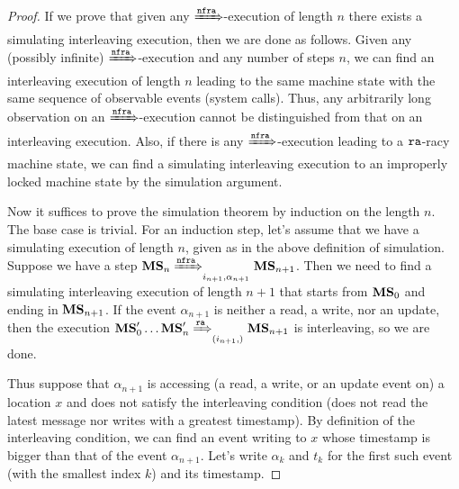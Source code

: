 \begin{proof}


If we prove that given any $\xRightarrow{\texttt{nf}\texttt{ra}}$-execution of length $n$
there exists a simulating interleaving execution, then we are done as
follows.  Given any (possibly infinite) $\xRightarrow{\texttt{nf}\texttt{ra}}$-execution and
any number of steps $n$, we can find an interleaving execution of
length $n$ leading to the same machine state with the same sequence of
observable events (\ie system calls). Thus, any arbitrarily long
observation on an $\xRightarrow{\texttt{nf}\texttt{ra}}$-execution cannot be distinguished
from that on an interleaving execution. Also, if there is any
$\xRightarrow{\texttt{nf}\texttt{ra}}$-execution leading to a $\texttt{ra}$-racy machine state, we
can find a simulating interleaving execution to an improperly locked
machine state by the simulation argument.

Now it suffices to prove the simulation theorem by induction on the
length $n$.  The base case is trivial. For an induction step, let's
assume that we have a simulating execution of length $n$, given as in
the above definition of simulation. Suppose we have a step ${\mathbf{MS}}_n
\xRightarrow{\texttt{nf}\texttt{ra}}_{i_{n+1},\alpha_{n+1}} {\mathbf{MS}}_{n+1}$.  Then we need to
find a simulating interleaving execution of length $n+1$ that starts
from ${\mathbf{MS}}_0$ and ending in ${\mathbf{MS}}_{n+1}$. If the event
$\alpha_{n+1}$ is neither a read, a write, nor an update, then the
execution ${\mathbf{MS}}'_0 \ldots {\mathbf{MS}}'_n \xRightarrow{\texttt{ra}}_{(i_{n+1},)}
{\mathbf{MS}}_{n+1}$ is interleaving, so we are done.

Thus suppose that $\alpha_{n+1}$ is accessing (\ie a read, a write, or
an update event on) a location $x$ and does not satisfy the
interleaving condition (\ie does not read the latest message nor
writes with a greatest timestamp).
By definition of the interleaving
condition, we can find an event writing to $x$ whose timestamp is
bigger than that of the event $\alpha_{n+1}$. Let's write $\alpha_k$
and $t_k$ for the first such event (\ie with the smallest index $k$)
and its timestamp.


\end{proof}
